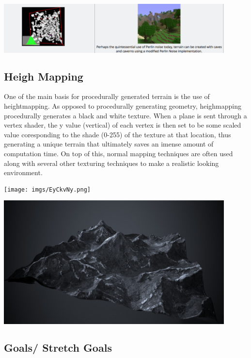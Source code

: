 \documentclass[12pt]{article}
\begin{document}
\begin{center}
    \includegraphics[width=0.9\textwidth]{imgs/noise.png}
\end{center}

\subsection{Heigh Mapping}

One of the main basis for procedurally generated terrain is the use of heightmapping. As opposed to procedurally 
generating geometry, heighmapping procedurally generates a black and white texture. When a plane is sent through a 
vertex shader, the y value (vertical) of each vertex is then set to be some scaled value coresponding to the shade 
(0-255) of the texture at that location, thus generating a unique terrain that ultimately saves an imense amount of 
computation time. On top of this, normal mapping techniques are often used along with several other texturing 
techniques to make a realistic looking environment.

\begin{center}
    \begin{minipage}{0.45\textwidth}
        \texttt{[image: imgs/EyCkvNy.png]}
    \end{minipage}
    \begin{minipage}{0.45\textwidth}
        \includegraphics[width=0.9\textwidth]{imgs/height.jpg}
    \end{minipage}
\end{center}

\subsection{Goals/ Stretch Goals}
\end{document}
